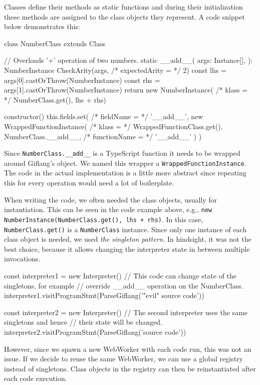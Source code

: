 Classes define their methods as static functions and during their initialization these methods are assigned to the class objects they represent.
A code snippet below demonstrates this:
\begin{code}
class NumberClass extends Class {
    // Overloads '+' operation of two numbers.
    static __add__(
        args: Instance[],
    ): NumberInstance {
        CheckArity(args, /* expectedArity = */ 2)
        const lhs = args[0].castOrThrow(NumberInstance)
        const rhs = args[1].castOrThrow(NumberInstance)
        return new NumberInstance(
            /* klass = */ NumberClass.get(), lhs + rhs)
    }

    constructor() {
        this.fields.set(
            /* fieldName = */ '__add__',
            new WrappedFunctionInstance(
                /* klass = */ WrappedFunctionClass.get(),
                NumberClass.__add__,
                /* functionName = */ '__add__'
            )
        )
    }
}
\end{code}

Since \texttt{NumberClass.\_\_add\_\_} is a TypeScript function it needs to be wrapped around Giflang's object. We named this wrapper a \texttt{WrappedFunctionInstance}.
The code in the actual implementation is a little more abstract since repeating this for every operation would need a lot of boilerplate.

When writing the code, we often needed the class objects, usually for instantiation. This can be seen in the code example above, e.g.,
\texttt{new NumberInstance(NumberClass.get(), lhs + rhs)}. In this case, \texttt{NumberClass.get()} is a \texttt{NumberClass} instance. Since only one
instance of each class object is needed, we used \emph{the singleton pattern}. In hindsight, it was not the best choice, because it allows changing
the interpreter state in between multiple invocations.
\begin{code}
const interpreter1 = new Interpreter()
// This code can change state of the singletons, for example
// override __add__ operation on the NumberClass.
interpreter1.visitProgramStmt(ParseGiflang('"evil" source code'))

const interpreter2 = new Interpreter()
// The second interpreter uses the same singletons and hence
// their state will be changed.
interpreter2.visitProgramStmt(ParseGiflang('source code'))
\end{code}

However, since we spawn a new WebWorker with each code run, this was not an issue. If we decide to reuse the same WebWorker, we can use a global registry
instead of singletons. Class objects in the registry can then be reinstantiated after each code execution.


